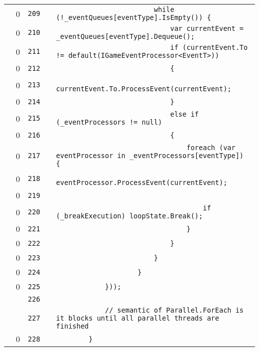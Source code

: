 \documentclass[a4paper,landscape,10pt]{article}
\begin{document}
\begin{longtable}[l]{lrrll}
\cellcolor{red} & 0 & \verb~209~ & & \verb~                        while (!_eventQueues[eventType].IsEmpty()) {~\\
\cellcolor{red} & 0 & \verb~210~ & & \verb~                            var currentEvent = _eventQueues[eventType].Dequeue();~\\
\cellcolor{red} & 0 & \verb~211~ & & \verb~                            if (currentEvent.To != default(IGameEventProcessor<EventT>))~\\
\cellcolor{red} & 0 & \verb~212~ & & \verb~                            {~\\
\cellcolor{red} & 0 & \verb~213~ & & \verb~                                currentEvent.To.ProcessEvent(currentEvent);~\\
\cellcolor{red} & 0 & \verb~214~ & & \verb~                            }~\\
\cellcolor{red} & 0 & \verb~215~ & & \verb~                            else if (_eventProcessors != null)~\\
\cellcolor{red} & 0 & \verb~216~ & & \verb~                            {~\\
\cellcolor{red} & 0 & \verb~217~ & & \verb~                                foreach (var eventProcessor in _eventProcessors[eventType]) {~\\
\cellcolor{red} & 0 & \verb~218~ & & \verb~                                    eventProcessor.ProcessEvent(currentEvent);~\\
\cellcolor{red} & 0 & \verb~219~ & & \verb~~\\
\cellcolor{red} & 0 & \verb~220~ & & \verb~                                    if (_breakExecution) loopState.Break();~\\
\cellcolor{red} & 0 & \verb~221~ & & \verb~                                }~\\
\cellcolor{red} & 0 & \verb~222~ & & \verb~                            }~\\
\cellcolor{red} & 0 & \verb~223~ & & \verb~                        }~\\
\cellcolor{red} & 0 & \verb~224~ & & \verb~                    }~\\
\cellcolor{red} & 0 & \verb~225~ & & \verb~            }));~\\
\cellcolor{gray} &  & \verb~226~ & & \verb~~\\
\cellcolor{gray} &  & \verb~227~ & & \verb~            // semantic of Parallel.ForEach is it blocks until all parallel threads are finished~\\
\cellcolor{red} & 0 & \verb~228~ & & \verb~        }~\\

\end{longtable}
\end{document}

